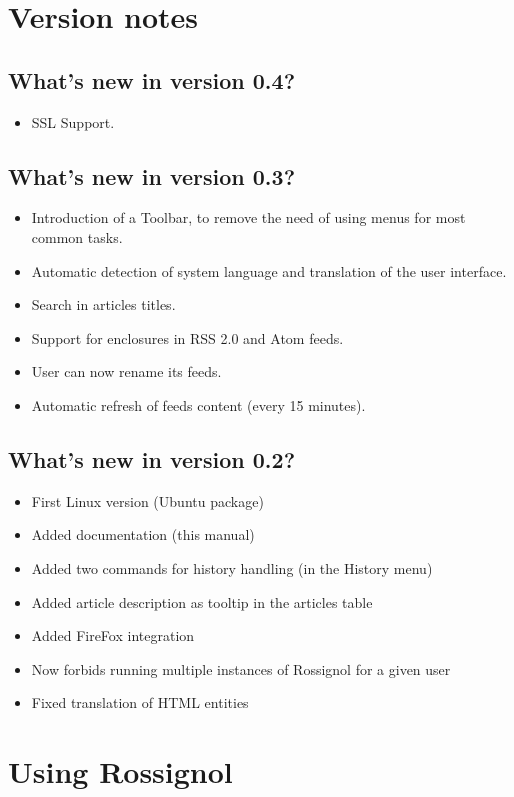 \documentclass[11pt]{article} %
\begin{document}
\section{Version notes}

\subsection{What's new in version 0.4?}
\begin{itemize}
\item SSL Support.
\end{itemize}

\subsection{What's new in version 0.3?}
\begin{itemize}
\item Introduction of a Toolbar, to remove the need of using menus for most 
common tasks.
\item Automatic detection of system language and translation of the user 
interface.
\item Search in articles titles.
\item Support for enclosures in RSS 2.0 and Atom feeds.
\item User can now rename its feeds.
\item Automatic refresh of feeds content (every 15 minutes).
\end{itemize}

\subsection{What's new in version 0.2?}
\begin{itemize}
\item First Linux version (Ubuntu package)
\item Added documentation (this manual)
\item Added two commands for history handling (in the History menu)
\item Added article description as tooltip in the articles table
\item Added FireFox integration 
\item Now forbids running multiple instances of Rossignol for a given user 
\item Fixed translation of HTML entities
\end{itemize}

\section{Using Rossignol}
\end{document}
